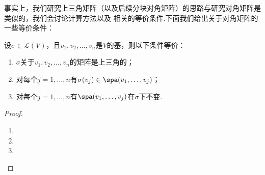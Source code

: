 事实上，我们研究上三角矩阵（以及后续分块对角矩阵）的思路与研究对角矩阵是类似的，我们会讨论计算方法以及
相关的等价条件.下面我们给出关于对角矩阵的一些等价条件：
\begin{theorem}\label{thm:20:上三角矩阵等价条件}
    设$\sigma\in \mathcal{L}(V)$，且$v_1,v_2,\ldots,v_n$是$V$的基，则以下条件等价：
    \begin{enumerate}
        \item $\sigma$关于$v_1,v_2,\ldots,v_n$的矩阵是上三角的；

        \item 对每个$j=1,\ldots,n$有$\sigma(v_j)\in\spa(v_1,\ldots,v_j)$；

        \item 对每个$j=1,\ldots,n$有$\spa(v_1,\ldots,v_j)$在$\sigma$下不变.
    \end{enumerate}
\end{theorem}
\begin{proof}
    \begin{enumerate}
        \item 
        \item 
        \item 
    \end{enumerate}
\end{proof}

